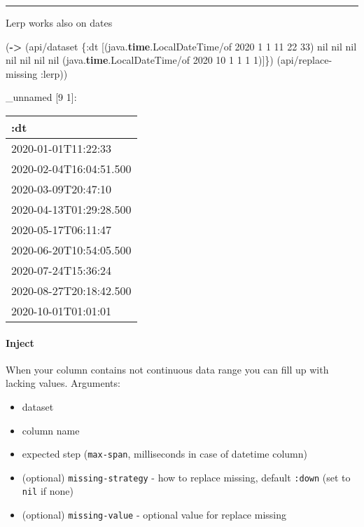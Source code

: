 \documentclass[]{article}
\newenvironment{Shaded}{\begin{snugshade}}{\end{snugshade}}
\newcommand{\AttributeTok}[1]{\textcolor[rgb]{0.77,0.63,0.00}{#1}}
\newcommand{\DecValTok}[1]{\textcolor[rgb]{0.00,0.00,0.81}{#1}}
\newcommand{\KeywordTok}[1]{\textcolor[rgb]{0.13,0.29,0.53}{\textbf{#1}}}
\newcommand{\NormalTok}[1]{#1}
\newcommand{\VariableTok}[1]{\textcolor[rgb]{0.00,0.00,0.00}{#1}}
\providecommand{\tightlist}{%
  \setlength{\itemsep}{0pt}\setlength{\parskip}{0pt}}
\let\oldparagraph\paragraph
\renewcommand{\paragraph}[1]{\oldparagraph{#1}\mbox{}}
\begin{document}
\begin{center}\rule{0.5\linewidth}{0.5pt}\end{center}

Lerp works also on dates

\begin{Shaded}
\begin{Highlighting}[]
\NormalTok{(}\KeywordTok{->}\NormalTok{ (api/dataset \{}\AttributeTok{:dt}\NormalTok{ [(java.}\KeywordTok{time}\NormalTok{.LocalDateTime/of }\DecValTok{2020} \DecValTok{1} \DecValTok{1} \DecValTok{11} \DecValTok{22} \DecValTok{33}\NormalTok{)}
                       \VariableTok{nil} \VariableTok{nil} \VariableTok{nil} \VariableTok{nil} \VariableTok{nil} \VariableTok{nil} \VariableTok{nil}
\NormalTok{                       (java.}\KeywordTok{time}\NormalTok{.LocalDateTime/of }\DecValTok{2020} \DecValTok{10} \DecValTok{1} \DecValTok{1} \DecValTok{1} \DecValTok{1}\NormalTok{)]\})}
\NormalTok{    (api/replace-missing }\AttributeTok{:lerp}\NormalTok{))}
\end{Highlighting}
\end{Shaded}

\_unnamed {[}9 1{]}:

\begin{longtable}[]{@{}l@{}}
\toprule
:dt\tabularnewline
\midrule
\endhead
2020-01-01T11:22:33\tabularnewline
2020-02-04T16:04:51.500\tabularnewline
2020-03-09T20:47:10\tabularnewline
2020-04-13T01:29:28.500\tabularnewline
2020-05-17T06:11:47\tabularnewline
2020-06-20T10:54:05.500\tabularnewline
2020-07-24T15:36:24\tabularnewline
2020-08-27T20:18:42.500\tabularnewline
2020-10-01T01:01:01\tabularnewline
\bottomrule
\end{longtable}

\hypertarget{inject}{%
\paragraph{Inject}\label{inject}}

When your column contains not continuous data range you can fill up with
lacking values. Arguments:

\begin{itemize}
\tightlist
\item
  dataset
\item
  column name
\item
  expected step (\texttt{max-span}, milliseconds in case of datetime
  column)
\item
  (optional) \texttt{missing-strategy} - how to replace missing, default
  \texttt{:down} (set to \texttt{nil} if none)
\item
  (optional) \texttt{missing-value} - optional value for replace missing
\end{itemize}
\end{document}
